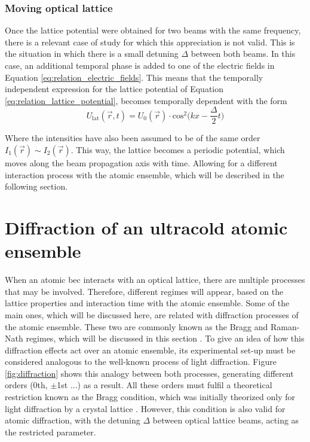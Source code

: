\subsubsection{Moving optical lattice}

Once the lattice potential were obtained for two beams with the same frequency, there is a relevant case of study for which this appreciation is not valid. This is the situation in which there is a small detuning $\Delta$ between both beams. In this case, an additional temporal phase is added to one of the electric fields in Equation \eqref{eq:relation_electric_fields}. This means that the temporally independent expression for the lattice potential of Equation \eqref{eq:relation_lattice_potential}, becomes temporally dependent with the form
\begin{equation}\label{eq:relation_moving_lattice_potential}
	U_{\text{lat}}(\vec{r},t) = U_{0}(\vec{r}) \cdot \text{cos}^2\bigg(kx-\frac{\Delta}{2}t\bigg)
\end{equation} 

Where the intensities have also been assumed to be of the same order $I_{1}(\vec{r}) \sim I_{2}(\vec{r})$. This way, the lattice becomes a periodic potential, which moves along the beam propagation axis with time. Allowing for a different interaction process with the atomic ensemble, which will be described in the following section.


\section{Diffraction of an ultracold atomic ensemble}

When an atomic \ac{bec} interacts with an optical lattice, there are multiple processes that may be involved. Therefore, different regimes will appear, based on the lattice properties and interaction time with the atomic ensemble. Some of the main ones, which will be discussed here, are related with diffraction processes of the atomic ensemble. These two are commonly known as the Bragg and Raman-Nath regimes, which will be discussed in this section \cite{Mueller2008,Ovchinnikov1999}. To give an idea of how this diffraction effects act over an atomic ensemble, its experimental set-up must be considered analogous to the well-known process of light diffraction. Figure \ref{fig:diffraction} shows this analogy between both processes, generating different orders (0th, $\pm$1st ...) as a result. All these orders must fulfil a theoretical restriction known as the Bragg condition, which was initially theorized only for light diffraction by a crystal lattice \cite{Bragg1913}. However, this condition is also valid for atomic diffraction, with the detuning $\Delta$ between optical lattice beams, acting as the restricted parameter.


